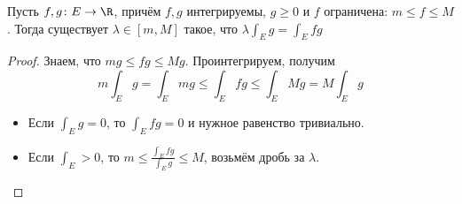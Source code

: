 \begin{theorem}
	Пусть $f, g \colon E \to \R$, причём $f, g$ интегрируемы, $g \ge 0$
	и $f$ ограничена: $m \le f \le M$.
	Тогда существует $\lambda \in [m, M]$ такое, что $\lambda \int_E g = \int_E fg$
\end{theorem}
\begin{proof}
	Знаем, что $mg \le fg \le Mg$.
	Проинтегрируем, получим
	\[
	m \int_E g = \int_E mg \le \int_E fg \le \int_E Mg = M \int_E g
	\]
	\begin{itemize}
	\item
		Если $\int_E g=0$, то $\int_E fg = 0$ и нужное равенство тривиально.
	\item
		Если $\int_E > 0$, то $m \le \frac{\int_E fg}{\int_E g} \le M$, возьмём дробь за $\lambda$.
	\end{itemize}
\end{proof}

